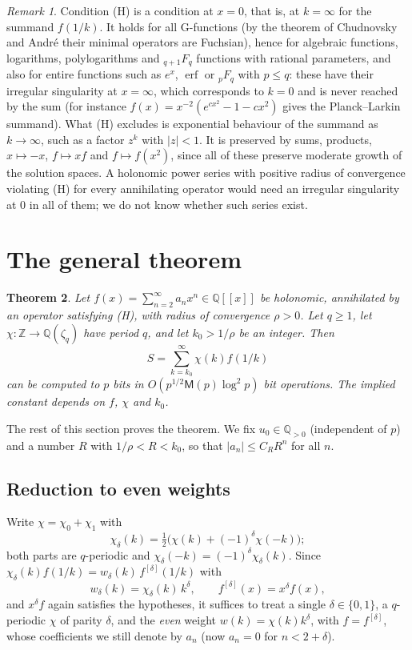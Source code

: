 \documentclass[11pt,reqno]{amsart}
\newtheorem{theorem}{Theorem}[section]
\theoremstyle{definition}
\theoremstyle{remark}
\newtheorem{remark}[theorem]{Remark}
\newcommand{\erf}{\operatorname{erf}}
\newcommand{\QQ}{\mathbb{Q}}
\newcommand{\ZZ}{\mathbb{Z}}
\newcommand{\Mul}{\mathsf{M}}
\begin{document}
\begin{remark}\label{rem:H}
Condition (H) is a condition at $x = 0$, that is, at $k = \infty$ for the summand $f(1/k)$. It holds for all
G-functions (by the theorem of Chudnovsky and Andr\'e their minimal operators are Fuchsian), hence for algebraic
functions, logarithms, polylogarithms and ${}_{q+1}F_q$ functions with rational parameters, and also for entire
functions such as $e^x$, $\erf$ or ${}_pF_q$ with $p \le q$: these have their irregular singularity at $x = \infty$,
which corresponds to $k = 0$ and is never reached by the sum (for instance $f(x) = x^{-2}(e^{cx^2} - 1 - cx^2)$
gives the Planck--Larkin summand). What (H) excludes is exponential behaviour of the summand as $k \to \infty$,
such as a factor $z^k$ with $|z| < 1$. It is preserved
by sums, products, $x \mapsto -x$, $f \mapsto x f$ and $f \mapsto f(x^2)$, since all of these preserve
moderate growth of the solution spaces. A holonomic power series with positive radius of convergence
violating (H) for every annihilating operator would need an irregular singularity at $0$ in all of
them; we do not know whether such series exist.
\end{remark}

\section{The general theorem}\label{sec:general}

\begin{theorem}\label{thm:main}
Let $f(x) = \sum_{n=2}^{\infty} a_n x^n \in \QQ[[x]]$ be holonomic, annihilated by an operator satisfying (H),
with radius of convergence $\rho > 0$. Let $q \ge 1$, let $\chi \colon \ZZ \to \QQ(\zeta_q)$ have period $q$, and
let $k_0 > 1/\rho$ be an integer. Then
\[
  S = \sum_{k=k_0}^{\infty} \chi(k) f(1/k)
\]
can be computed to $p$ bits in $O(p^{1/2}\Mul(p)\log^2 p)$ bit operations.
The implied constant depends on $f$, $\chi$ and $k_0$.
\end{theorem}

The rest of this section proves the theorem. We fix $u_0 \in \QQ_{>0}$ (independent of $p$) and a
number $R$ with $1/\rho < R < k_0$, so that $|a_n| \le C_R R^n$ for all $n$.

\subsection{Reduction to even weights}
Write $\chi = \chi_0 + \chi_1$ with
\[
  \chi_\delta(k) = \tfrac12\bigl(\chi(k) + (-1)^\delta\chi(-k)\bigr);
\]
both parts are $q$-periodic and $\chi_\delta(-k) = (-1)^\delta \chi_\delta(k)$. Since
$\chi_\delta(k) f(1/k) = w_\delta(k)\, f^{[\delta]}(1/k)$ with
\[
  w_\delta(k) = \chi_\delta(k)\, k^\delta, \qquad f^{[\delta]}(x) = x^\delta f(x),
\]
and $x^\delta f$ again satisfies the hypotheses, it suffices to treat a single $\delta \in \{0,1\}$, a
$q$-periodic $\chi$ of parity $\delta$, and the \emph{even} weight $w(k) = \chi(k)k^\delta$, with
$f = f^{[\delta]}$, whose coefficients we still denote by $a_n$ (now $a_n = 0$ for $n < 2 + \delta$).
\end{document}
